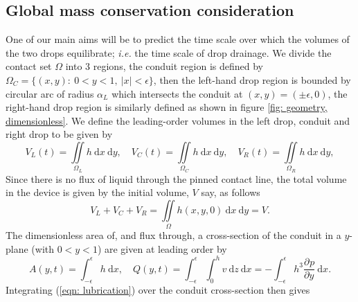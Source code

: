 \documentclass{jfm}
\newcommand{\pD}[3]{\frac{ \partial^{#3} {#1} }{ \partial {#2}^{#3} }}
\newcommand{\dv}[1]{ \ \text{d} #1}
\begin{document}
\subsection{Global mass conservation consideration}
 
One of our main aims will be to predict the time scale  over which  the volumes of the two drops  equilibrate; {\it {i.e.}\ignorespaces}  the time scale of   drop drainage. 
We divide the contact set $\Omega$ into 3 regions, the conduit region  is defined by $\Omega_C=\{ (x,y)  : \ 0<y <1, \ |x| <\epsilon   \}$,  then the   left-hand drop region is bounded by  circular arc of radius $\alpha_L$ which intersects the conduit at $(x,y) = (\pm \epsilon,  0 )$, the right-hand drop region is similarly defined as shown in figure \ref{fig: geometry, dimensionless}. 
We define the leading-order volumes in the left drop,  conduit  and right drop to be  given by  
\label{eqn: vols}
\begin{equation}
{V_L}({t}) = \iint\limits_{\Omega_L} {h} \dv{{x}}\! \dv{{y}} ,\quad {V_C}({t}) = \iint\limits_{\Omega_C} {h} \dv{{x}}\! \dv{{y}} ,\quad {V_R}({t}) = \iint\limits_{\Omega_R} {h} \dv{{x}}\! \dv{{y}}, \tag{\theequation a--c} 
\end{equation}   
Since  there is no flux of liquid through the pinned contact line,  the total volume in the device is given by the initial volume, $V$  say, as follows 
\begin{equation}
{V_L} +{V_C}+{V_R}  = \iint\limits_{\Omega} {h} ({x},{y},0)\dv{{x}}\! \dv{{y}} ={V}. 
\end{equation}
The dimensionless area of, and flux through, a  cross-section  of the conduit in a   ${y}$-plane (with $0<{y}<1$) are given at leading order by  
\label{eqn:  conduit  flux area} %
\begin{equation}
{A}({y},{t}) = \int_{-\epsilon}^{\epsilon} {h} \dv{{x}}, \quad {Q}({y},{t}) =\int_{-\epsilon}^{\epsilon} \int_0^{h} {v}\dv{{z}}\! \dv{{x}} = -\int_{-\epsilon}^{\epsilon} {h}^3 \pD{{p}}{{y}}{} \dv{{x}} .  \tag{\theequation a,b} 
\end{equation} 
Integrating  (\ref{eqn: lubrication}) over the  conduit  cross-section  then gives 
\end{document}
